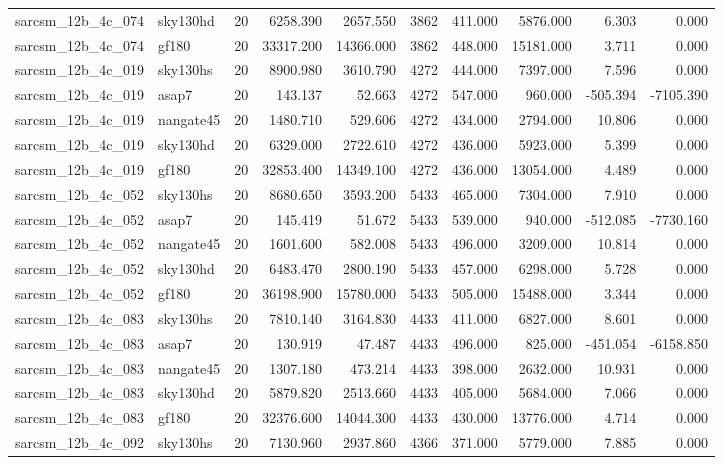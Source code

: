 \documentclass{article}
\begin{document}
\begin{longtable}{llrrrrrrrr}
sarcsm\_12b\_4c\_074 & sky130hd & 20 & 6258.390 & 2657.550 & 3862 & 411.000 & 5876.000 & 6.303 & 0.000 \\
sarcsm\_12b\_4c\_074 & gf180 & 20 & 33317.200 & 14366.000 & 3862 & 448.000 & 15181.000 & 3.711 & 0.000 \\
sarcsm\_12b\_4c\_019 & sky130hs & 20 & 8900.980 & 3610.790 & 4272 & 444.000 & 7397.000 & 7.596 & 0.000 \\
sarcsm\_12b\_4c\_019 & asap7 & 20 & 143.137 & 52.663 & 4272 & 547.000 & 960.000 & -505.394 & -7105.390 \\
sarcsm\_12b\_4c\_019 & nangate45 & 20 & 1480.710 & 529.606 & 4272 & 434.000 & 2794.000 & 10.806 & 0.000 \\
sarcsm\_12b\_4c\_019 & sky130hd & 20 & 6329.000 & 2722.610 & 4272 & 436.000 & 5923.000 & 5.399 & 0.000 \\
sarcsm\_12b\_4c\_019 & gf180 & 20 & 32853.400 & 14349.100 & 4272 & 436.000 & 13054.000 & 4.489 & 0.000 \\
sarcsm\_12b\_4c\_052 & sky130hs & 20 & 8680.650 & 3593.200 & 5433 & 465.000 & 7304.000 & 7.910 & 0.000 \\
sarcsm\_12b\_4c\_052 & asap7 & 20 & 145.419 & 51.672 & 5433 & 539.000 & 940.000 & -512.085 & -7730.160 \\
sarcsm\_12b\_4c\_052 & nangate45 & 20 & 1601.600 & 582.008 & 5433 & 496.000 & 3209.000 & 10.814 & 0.000 \\
sarcsm\_12b\_4c\_052 & sky130hd & 20 & 6483.470 & 2800.190 & 5433 & 457.000 & 6298.000 & 5.728 & 0.000 \\
sarcsm\_12b\_4c\_052 & gf180 & 20 & 36198.900 & 15780.000 & 5433 & 505.000 & 15488.000 & 3.344 & 0.000 \\
sarcsm\_12b\_4c\_083 & sky130hs & 20 & 7810.140 & 3164.830 & 4433 & 411.000 & 6827.000 & 8.601 & 0.000 \\
sarcsm\_12b\_4c\_083 & asap7 & 20 & 130.919 & 47.487 & 4433 & 496.000 & 825.000 & -451.054 & -6158.850 \\
sarcsm\_12b\_4c\_083 & nangate45 & 20 & 1307.180 & 473.214 & 4433 & 398.000 & 2632.000 & 10.931 & 0.000 \\
sarcsm\_12b\_4c\_083 & sky130hd & 20 & 5879.820 & 2513.660 & 4433 & 405.000 & 5684.000 & 7.066 & 0.000 \\
sarcsm\_12b\_4c\_083 & gf180 & 20 & 32376.600 & 14044.300 & 4433 & 430.000 & 13776.000 & 4.714 & 0.000 \\
sarcsm\_12b\_4c\_092 & sky130hs & 20 & 7130.960 & 2937.860 & 4366 & 371.000 & 5779.000 & 7.885 & 0.000 \\

\end{longtable}
\end{document}

